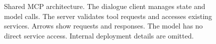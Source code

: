 
\begin{figure}[!b]
    \centering
    \resizebox{\textwidth}{!}{}
    \caption{Shared MCP architecture. The dialogue client manages state and model calls. The server validates tool requests and accesses existing services. Arrows show requests and responses. The model has no direct service access. Internal deployment details are omitted.}
    \label{fig:paper-architecture}
\end{figure}



 

